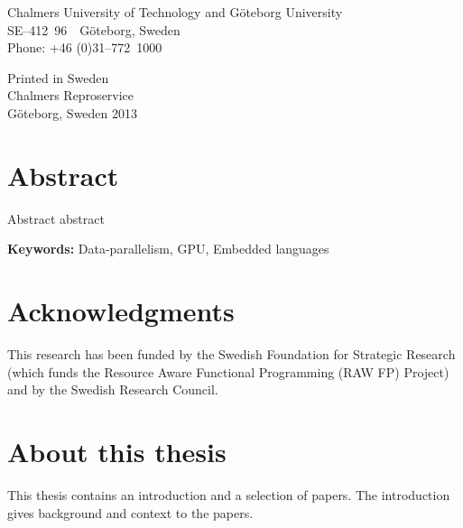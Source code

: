 \documentclass[a4paper]{book}
\newcommand{\uni}{Chalmers University of Technology and G\"oteborg University}
\begin{document}
\vspace{1cm} 

\noindent \uni \\
\noindent SE--412~96~~G\"oteborg, Sweden\\
\noindent Phone: +46 (0)31--772~1000 \\

\vspace{1cm} 

\noindent Printed in Sweden\\
\noindent Chalmers Reproservice\\
\noindent G\"oteborg, Sweden 2013


\thispagestyle{empty}

\clearpage
{}

\section*{Abstract}
Abstract abstract 

\vspace{5mm}

\noindent

 \textbf{Keywords:} Data-parallelism, GPU, Embedded languages

\clearpage

\section*{Acknowledgments}


\vspace{5mm}
\noindent This research has been funded by the Swedish Foundation for
Strategic Research (which funds the Resource Aware Functional 
Programming (RAW FP) Project) and by the Swedish Research Council.

\clearpage

\section*{About this thesis} 

This thesis contains an introduction and a selection of papers. The introduction 
gives background and context to the papers. 
\end{document}
